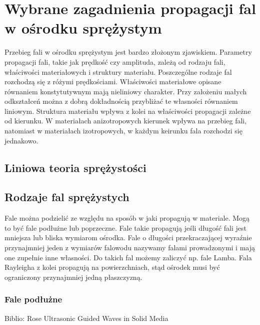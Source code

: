 \chapter{Wybrane zagadnienia propagacji fal w ośrodku sprężystym}
\label{cha:wybrane_zagadnienia_propagacji_fal_w_osrodku_sprezystym}


Przebieg fali w ośrodku sprężystym jest bardzo złożonym zjawiskiem. Parametry propagacji fali, takie jak prędkość czy amplituda, zależą od rodzaju fali, właściwości materiałowych i struktury materiału. Poszczególne rodzaje fal rozchodzą się z różymi prędkościami. Właściwości materiałowe opisane równaniem konstytutywnym mają nieliniowy charakter. Przy założeniu małych odkształceń można z dobrą dokładnością przybliżać te własności równaniem liniowym. Struktura materiału wpływa z kolei na właściwości propagacji zależne od kierunku. W materiałach anizotropowych kierunek wpływa na przebieg fali, natomiast w materiałach izotropowych, w każdym keirunku fala rozchodzi się jednakowo.




\section{Liniowa teoria sprężystości}
\label{sec:liniowa_teoria_sprezystosci}


\section{Rodzaje fal sprężystych}
\label{sec:rodzaje_fal_sprezystych}

Fale można podzielić ze względu na sposób w jaki propagują w materiale. Mogą to być fale podłużne lub poprzeczne. Fale takie propagują jeśli długość fali jest mniejsza lub bliska wymiarom ośrodka. Fale o długości przekraczającej wyraźnie przynajmniej jeden z wymiarów falowodu nazywamy falami prowadzonymi i mają one zupełnie inne własności. Do takich fal możemy zaliczyć np. fale Lamba. Fala Rayleigha z kolei propagują na powierzchniach, stąd ośrodek musi być ograniczony przynajmniej jedną płaszczyzną.

\subsection{Fale podłużne}
Biblio: Rose Ultrasonic Guided Waves in Solid Media

